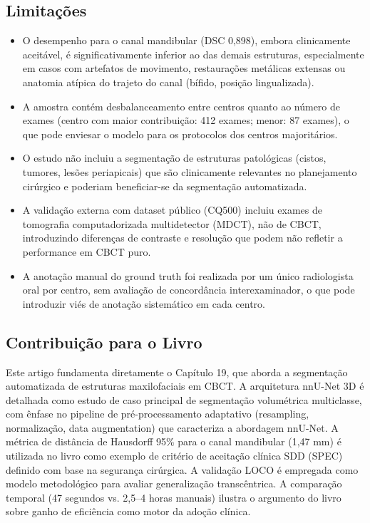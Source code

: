 \subsection{Limitações}
\begin{itemize}
  \item O desempenho para o canal mandibular (DSC 0,898), embora
        clinicamente aceitável, é significativamente inferior ao das
        demais estruturas, especialmente em casos com artefatos de
        movimento, restaurações metálicas extensas ou anatomia
        atípica do trajeto do canal (bífido, posição lingualizada).
  \item A amostra contém desbalanceamento entre centros quanto ao
        número de exames (centro com maior contribuição: 412 exames;
        menor: 87 exames), o que pode enviesar o modelo para os
        protocolos dos centros majoritários.
  \item O estudo não incluiu a segmentação de estruturas patológicas
        (cistos, tumores, lesões periapicais) que são clinicamente
        relevantes no planejamento cirúrgico e poderiam beneficiar-se
        da segmentação automatizada.
  \item A validação externa com dataset público (CQ500) incluiu exames
        de tomografia computadorizada multidetector (MDCT), não de
        CBCT, introduzindo diferenças de contraste e resolução que
        podem não refletir a performance em CBCT puro.
  \item A anotação manual do ground truth foi realizada por um único
        radiologista oral por centro, sem avaliação de concordância
        interexaminador, o que pode introduzir viés de anotação
        sistemático em cada centro.
\end{itemize}

\subsection{Contribuição para o Livro}
Este artigo fundamenta diretamente o Capítulo 19, que aborda a
segmentação automatizada de estruturas maxilofaciais em CBCT. A
arquitetura nnU-Net 3D é detalhada como estudo de caso principal de
segmentação volumétrica multiclasse, com ênfase no pipeline de
pré-processamento adaptativo (resampling, normalização, data
augmentation) que caracteriza a abordagem nnU-Net. A métrica de
distância de Hausdorff 95\% para o canal mandibular (1,47 mm) é
utilizada no livro como exemplo de critério de aceitação clínica SDD
(SPEC) definido com base na segurança cirúrgica. A validação LOCO é
empregada como modelo metodológico para avaliar generalização
transcêntrica. A comparação temporal (47 segundos vs. 2,5--4 horas
manuais) ilustra o argumento do livro sobre ganho de eficiência como
motor da adoção clínica.

